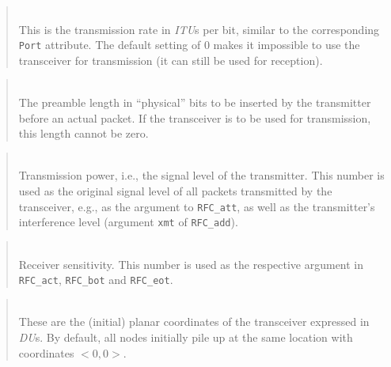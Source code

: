 \begin{quote}
\noindent{}\\ \hspace{0in}
This is the transmission rate in {\em ITU\/}s per bit,
similar to the corresponding {\tt Port} attribute.
The default setting of 0 makes it impossible to use the transceiver
for transmission (it can still be used for reception).
\end{quote}

\begin{quote}
\noindent{}\\ \hspace{0in}
The preamble length in ``physical'' bits to be inserted by the transmitter
before an actual packet.
If the transceiver is to be used for transmission, this
length cannot be zero.
\end{quote}

\begin{quote}
\noindent{}\\ \hspace{0in}
Transmission power, i.e., the signal level of the transmitter.
This number is used as the original signal level of all packets transmitted
by the transceiver, e.g., as the argument to {\tt RFC\_att}, as well as the
transmitter's interference level (argument {\tt xmt} of {\tt RFC\_add}).
\end{quote}

\begin{quote}
\noindent{}\\ \hspace{0in}
Receiver sensitivity.
This number is used as the respective argument
in {\tt RFC\_act}, {\tt RFC\_bot} and {\tt RFC\_eot}.
\end{quote}

\begin{quote}
\noindent{}\\ \hspace{0in}
These are the (initial) planar coordinates of the transceiver expressed
in {\em DU\/}s.
By default, all nodes initially pile up at the same location with
coordinates $<0,0>$.
\end{quote}

